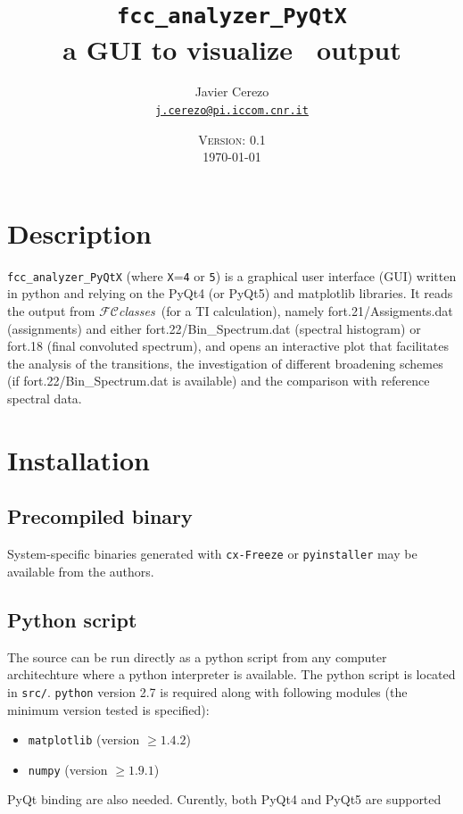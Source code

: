 \documentclass[a4paper,11pt]{article}
\title{\texttt{fcc\_analyzer\_PyQtX}\\ a GUI to visualize \fcc\ output}
\date{\textsc{Version: 0.1}\\\today}
\author{Javier Cerezo\\\href{mailto:j.cerezo@pi.iccom.cnr.it}{\texttt{j.cerezo@pi.iccom.cnr.it}}}
\begin{document}
\setlength{\parskip}{0.5em}
\newcommand{\fcc}{$\mathcal{FC}$\textit{classes}}

\maketitle

\section{Description}
\texttt{fcc\_analyzer\_PyQtX} (where \texttt{X}=\texttt{4} or \texttt{5}) is a graphical user interface (GUI) written in python and relying on the PyQt4 (or PyQt5) and matplotlib libraries. It reads the output from \fcc\ (for a TI calculation), namely fort.21/Assigments.dat (assignments) and either fort.22/Bin\_Spectrum.dat (spectral histogram) or fort.18 (final convoluted spectrum), and opens an interactive plot that facilitates the analysis of the transitions, the investigation of different broadening schemes (if fort.22/Bin\_Spectrum.dat is available) and the comparison with reference spectral data.

\section{Installation}

\subsection{Precompiled binary}
System-specific binaries generated with \texttt{cx-Freeze} or \texttt{pyinstaller} may be available from the authors.

\subsection{Python script}
The source can be run directly as a python script from any computer architechture where a python interpreter is available. The python script is located in \texttt{src/}. \texttt{python} version 2.7 is required along with following modules (the minimum version tested is specified):

\begin{itemize}
 \item \texttt{matplotlib} (version $\geq1.4.2$)
 \item \texttt{numpy} (version $\geq1.9.1$)
\end{itemize}

PyQt binding are also needed. Curently, both PyQt4 and PyQt5 are supported
\end{document}

